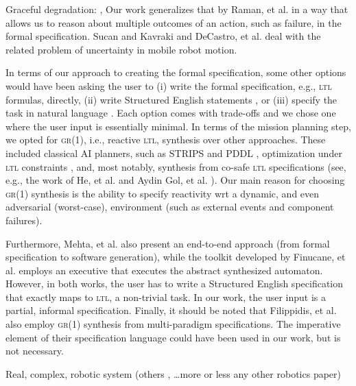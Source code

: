 
Graceful degradation: \cite{Kavraki2015AAAI}, \cite{Fainekos2014ICRA}
Our work generalizes that by Raman, et al. \cite{Vasu2013ICRA} in a way that allows us to reason about multiple outcomes of an action, such as failure, in the formal specification.
Sucan and Kavraki \cite{Kavraki2012ICRA} and DeCastro, et al. \cite{Jon2015ICRA} deal with the related problem of uncertainty in mobile robot motion.

In terms of our approach to creating the formal specification, some other options would have been asking the user to (i) write the formal specification, e.g., \textsc{ltl} formulas, directly, (ii) write Structured English statements \cite{JFRKG2012ICRA}, or (iii) specify the task in natural language \cite{Lignos2015AURO}.
Each option comes with trade-offs and we chose one where the user input is essentially minimal.
In terms of the mission planning step, we opted for \textsc{gr(1)}, i.e., reactive \textsc{ltl}, synthesis \cite{Bloem2012GR1} over other approaches.
These included classical AI planners, such as STRIPS \cite{STRIPS1971AI} and PDDL \cite{PDDL1998TR}, optimization under \textsc{ltl} constraints \cite{Wolff2014ICRA}, and, most notably, synthesis from co-safe \textsc{ltl} specifications (see, e.g., the work of He, et al. \cite{Kavraki2015ICRA} and Aydin Gol, et al. \cite{Belta2014TAC}).
Our main reason for choosing \textsc{gr(1)} synthesis is the ability to specify reactivity \ac{wrt} a dynamic, and even adversarial (worst-case), environment (such as external events and component failures).

Furthermore, Mehta, et al.\cite{Ankur2015ISRR} also present an end-to-end approach (from formal specification to software generation), while the toolkit developed by Finucane, et al. \cite{Finucane2010IROS} employs an executive that executes the abstract synthesized automaton.
However, in both works, the user has to write a Structured English \cite{JFRKG2012ICRA} specification that exactly maps to \textsc{ltl}, a non-trivial task.
In our work, the user input is a partial, informal specification.
Finally, it should be noted that Filippidis, et al. \cite{Filippidis2015SYNT} also employ \textsc{gr(1)} synthesis from multi-paradigm specifications.
The imperative element of their specification language could have been used in our work, but is not necessary.

Real, complex, robotic system (others \cite{Topcu2011RAM}, \ldots more or less any other robotics paper)

